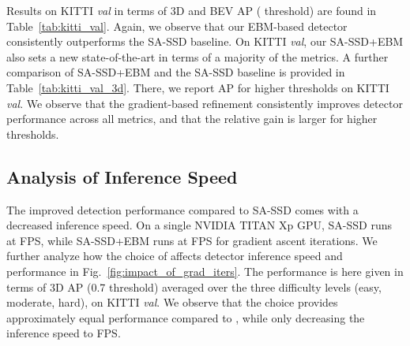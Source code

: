 \documentclass[letterpaper, 10 pt, conference]{ieeeconf}
\begin{document}
Results on KITTI \textit{val} in terms of 3D and BEV AP ( threshold) are found in Table~\ref{tab:kitti_val}. Again, we observe that our EBM-based detector consistently outperforms the SA-SSD baseline. On KITTI \textit{val}, our SA-SSD+EBM also sets a new state-of-the-art in terms of a majority of the metrics. A further comparison of SA-SSD+EBM and the SA-SSD baseline is provided in Table~\ref{tab:kitti_val_3d}. There, we report AP for higher thresholds  on KITTI \textit{val}. We observe that the gradient-based refinement consistently improves detector performance across all metrics, and that the relative gain is larger for higher thresholds.
















\subsection{Analysis of Inference Speed}
The improved detection performance compared to SA-SSD comes with a decreased inference speed. On a single NVIDIA TITAN Xp GPU, SA-SSD runs at  FPS, while SA-SSD+EBM runs at  FPS for  gradient ascent iterations. We further analyze how the choice of  affects detector inference speed and performance in Fig.~\ref{fig:impact_of_grad_iters}. The performance is here given in terms of 3D AP (0.7 threshold) averaged over the three difficulty levels (easy, moderate, hard), on KITTI \textit{val}. We observe that the choice  provides approximately equal performance compared to , while only decreasing the inference speed to  FPS.
\end{document}
